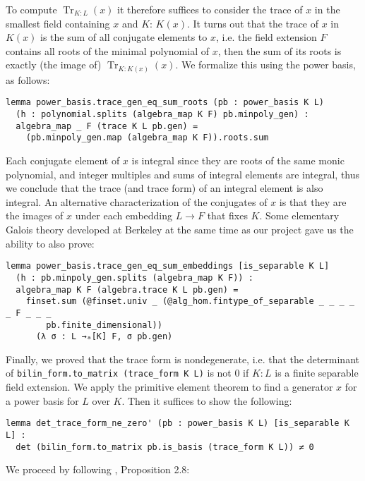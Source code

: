 \documentclass{lipics-v2021}
\newcommand{\lean}[1]{\texttt{#1}\xspace} %
\DeclareMathOperator{\Tr}{\mathrm{Tr}}
\begin{document}
To compute $\Tr_{K : L}(x)$ it therefore suffices to consider the trace of $x$ in the smallest field containing $x$ and $K$: $K(x)$.
It turns out that the trace of $x$ in $K(x)$ is the sum of all conjugate elements to $x$,
i.e. the field extension $F$ contains all roots of the minimal polynomial of $x$, then the sum of its roots is exactly (the image of) $\Tr_{K : K(x)}(x)$.
We formalize this using the power basis, as follows:
\begin{lstlisting}
lemma power_basis.trace_gen_eq_sum_roots (pb : power_basis K L)
  (h : polynomial.splits (algebra_map K F) pb.minpoly_gen) :
  algebra_map _ F (trace K L pb.gen) =
    (pb.minpoly_gen.map (algebra_map K F)).roots.sum
\end{lstlisting}
Each conjugate element of $x$ is integral since they are roots of the same monic polynomial,
and integer multiples and sums of integral elements are integral,
thus we conclude that the trace (and trace form) of an integral element is also integral.
An alternative characterization of the conjugates of $x$ is that they are the images of $x$ under each embedding $L \to F$ that fixes $K$.
Some elementary Galois theory developed at Berkeley at the same time as our project gave us the ability to also prove: %
\begin{lstlisting}
lemma power_basis.trace_gen_eq_sum_embeddings [is_separable K L]
  (h : pb.minpoly_gen.splits (algebra_map K F)) :
  algebra_map K F (algebra.trace K L pb.gen) =
    finset.sum (@finset.univ _ (@alg_hom.fintype_of_separable _ _ _ _ _ F _ _ _
        pb.finite_dimensional))
      (λ σ : L →ₐ[K] F, σ pb.gen)
\end{lstlisting}

Finally, we proved that the trace form is nondegenerate,
i.e. that the determinant of \lean{bilin\_form.to\_matrix (trace\_form K L)} is not $0$
if $K : L$ is a finite separable field extension.
We apply the primitive element theorem to find a generator $x$ for a power basis for $L$ over $K$.
Then it suffices to show the following:
\begin{lstlisting}
lemma det_trace_form_ne_zero' (pb : power_basis K L) [is_separable K L] :
  det (bilin_form.to_matrix pb.is_basis (trace_form K L)) ≠ 0
\end{lstlisting}
We proceed by following \cite{Neukirch}, Proposition 2.8:
\end{document}
